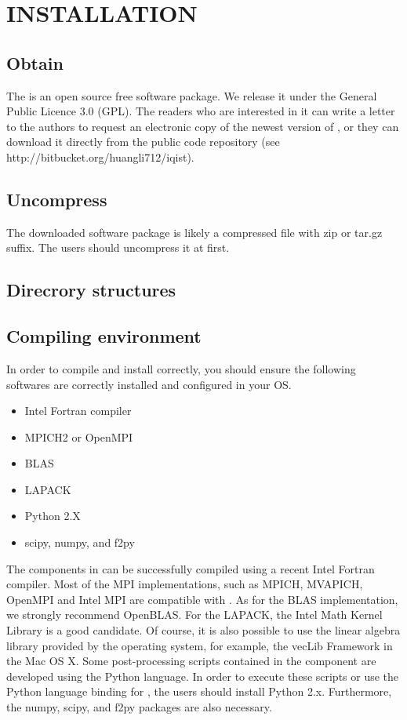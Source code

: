 \chapter{INSTALLATION}
\section{Obtain}

The {\iqist} is an open source free software package. We release it under the General Public Licence 3.0 (GPL). The readers who are interested in it can write a letter to the authors to request an electronic copy of the newest version of {\iqist}, or they can download it directly from the public code repository (see http://bitbucket.org/huangli712/iqist). 

\section{Uncompress}

The downloaded {\iqist} software package is likely a compressed file with zip or tar.gz suffix. The users should uncompress it at first. 

\section{Direcrory structures}

\section{Compiling environment}

In order to compile and install {\iqist} correctly, you should ensure the following softwares are correctly installed and configured in your OS.
\begin{itemize}
\item Intel Fortran compiler
\item MPICH2 or OpenMPI
\item BLAS
\item LAPACK
\item Python 2.X
\item scipy, numpy, and f2py
\end{itemize}
The components in {\iqist} can be successfully compiled using a recent Intel Fortran compiler. Most of the MPI implementations, such as MPICH, MVAPICH, OpenMPI and Intel MPI are compatible with {\iqist}. As for the BLAS implementation, we strongly recommend OpenBLAS. For the LAPACK, the Intel Math Kernel Library is a good candidate. Of course, it is also possible to use the linear algebra library provided by the operating system, for example, the vecLib Framework in the Mac OS X. Some post-processing scripts contained in the {\hibiscus} component are developed using the Python language. In order to execute these scripts or use the Python language binding for {\iqist}, the users should install Python 2.x. Furthermore, the numpy, scipy, and f2py packages are also necessary.

